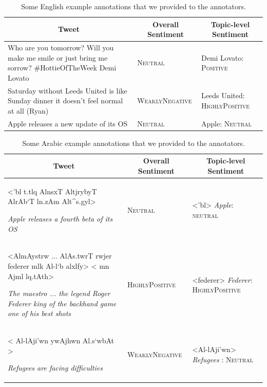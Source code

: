 \documentclass[11pt,a4paper]{article}
\begin{document}
\begin{table}[t!]
	\centering
	\resizebox{\textwidth}{!} {
		\begin{tabular}{|p{9cm}|p{1.5cm}|p{5.5cm}|}
			\hline
			\multicolumn{1}{|c|}{\bf Tweet} & \multicolumn{1}{c|}{\bf Overall Sentiment} & \multicolumn{1}{c|}{\bf Topic-level Sentiment} \\
			\hline
			Who are you tomorrow? Will you make me smile or just bring me sorrow? \#HottieOfTheWeek Demi Lovato	& \textsc{Neutral}	& Demi Lovato: \textsc{Positive} \\ \hline
			Saturday without Leeds United is like Sunday dinner it doesn't feel normal at all (Ryan)	& \textsc{WeaklyNegative}	& Leeds United: \textsc{HighlyPositive} \\
			\hline
           Apple releases a new update of its OS & \textsc{Neutral} &	Apple: \textsc{Neutral} \\
			\hline
		\end{tabular}
	}
	\caption{Some English example annotations that we provided to the annotators.}
	\label{T:annotation-examples}
\end{table}

\begin{table}[t!]
	\centering
    \resizebox{\textwidth}{!} {
		\begin{tabular}{|p{9cm}|p{1.5cm}|p{5.5cm}|}
			\hline
			\multicolumn{1}{|c|}{\bf Tweet} & \multicolumn{1}{c|}{\bf Overall Sentiment} & \multicolumn{1}{c|}{\bf Topic-level Sentiment} \\
			\hline
            <'bl t.tlq AlnsxT AltjrybyT AlrAb`T ln.zAm Alt^s.gyl> 
           
			\textit{Apple releases a fourth beta of its OS} &	\textsc{Neutral} &	  <'bl> \textit{Apple}: \textsc{neutral} \\
			\hline
            <AlmAystrw ... AlAs.twrT rwjer federer mlk Al-l`b alxlfy> 
        	< mn Ajml lq.tAth> 
            
            \textit{The maestro ... the legend Roger Federer king of the backhand game one of his best shots}  & \textsc{HighlyPositive}	& <federer> \textit{Federer}: \textsc{HighlyPositive} \\ \hline
			< Al-lAji'wn ywAjhwn Al.s`wbAt >
            
            \textit{Refugees are facing difficulties}	& \textsc{WeaklyNegative}	& <Al-lAji'wn> \textit{Refugees} : \textsc{Neutral} \\
			\hline
		\end{tabular}
        }
	\caption{Some Arabic example annotations that we provided to the annotators.}
	\label{T:annotation-arabic-examples}
\end{table}
\end{document}
